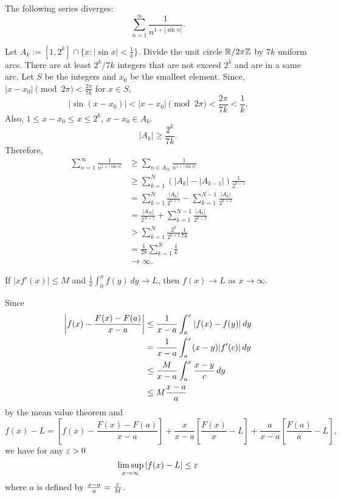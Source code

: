 \documentclass[11pt]{article}
\begin{document}
\begin{thm}
The following series diverges: \[\sum_{n=1}^\infty\frac1{n^{1+|\sin n|}}.\]
\end{thm}
\begin{pf}
Let $A_k:=[1,2^k]\cap\{x:|\sin x|<\frac1k\}$.
Divide the unit circle $\mathbb{R}/2\pi\mathbb{Z}$ by $7k$ uniform arcs.
There are at least $2^k/7k$ integers that are not exceed $2^k$ and are in a same arc.
Let $S$ be the integers and $x_0$ be the smallest element.
Since, $|x-x_0|\pmod{2\pi}<\frac{2\pi}{7k}$ for $x\in S$,
\[|\sin(x-x_0)|<|x-x_0|\pmod{2\pi}<\frac{2\pi}{7k}<\frac1k.\]
Also, $1\le x-x_0\le x\le2^k$, $x-x_0\in A_k$.
\[|A_k|\ge\frac{2^k}{7k}.\]
Therefore,
\begin{align*}
\sum_{n=1}^\infty\frac1{n^{1+|\sin n|}}
&\ge\sum_{n\in A_N}\frac1{n^{1+|\sin n|}}\\
&\ge\sum_{k=1}^N(|A_k|-|A_{k-1}|)\frac1{2^{k+1}}\\
&=\sum_{k=1}^N\frac{|A_k|}{2^{k+1}}-\sum_{k=1}^{N-1}\frac{|A_k|}{2^{k+2}}\\
&=\frac{|A_N|}{2^{N+1}}+\sum_{k=1}^{N-1}\frac{|A_k|}{2^{k+2}}\\
&>\sum_{k=1}^N\frac{2^k}{2^{k+2}}\frac1{7k}\\
&=\frac1{28}\sum_{k=1}^N\frac1k\\
&\to\infty.
\end{align*}
\end{pf}

\begin{thm}
If $|xf'(x)|\le M$ and $\frac1x\int_0^xf(y)\,dy\to L$, then $f(x)\to L$ as $x\to\infty$.
\end{thm}
\begin{pf}
Since
\begin{align*}
\left\lvert f(x)-\frac{F(x)-F(a)}{x-a}\right\rvert
&\le\frac1{x-a}\int_a^x|f(x)-f(y)|\,dy\\
&=\frac1{x-a}\int_a^x(x-y)|f'(c)|\,dy\\
&\le\frac M{x-a}\int_a^x\frac{x-y}c\,dy\\
&\le M\frac{x-a}a
\end{align*}
by the mean value theorem and 
\[f(x)-L=\left[f(x)-\frac{F(x)-F(a)}{x-a}\right]+\frac x{x-a}\left[\frac{F(x)}x-L\right]+\frac a{x-a}\left[\frac{F(a)}a-L\right],\]
we have for any $\varepsilon>0$
\[\limsup_{x\to\infty}|f(x)-L|\le\e\]
where $a$ is defined by $\frac{x-a}a=\frac{\varepsilon} M$.
\end{pf}

\clearpage
\end{document}
